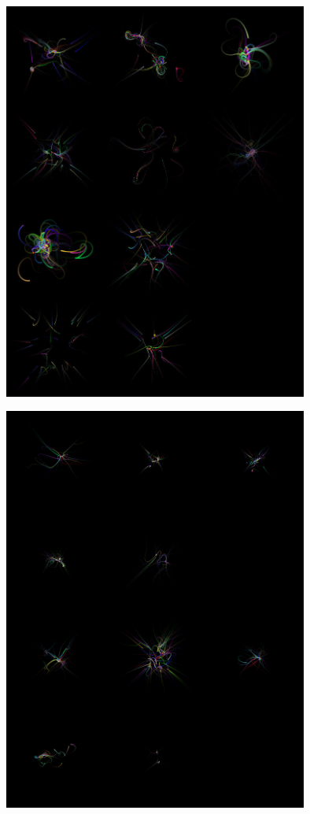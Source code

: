 \documentclass[12pt, a4paper]{article}
\begin{document}
\begin{center}
\begin{figure}[H]
\centering\includegraphics[width=10cm]{./fireflower.jpg}\\
\end{figure}
\end{center}
\begin{center}
\begin{figure}[H]
\centering\includegraphics[width=10cm]{./fireflower2.jpg}\\
\end{figure}
\end{center}
\end{document}

